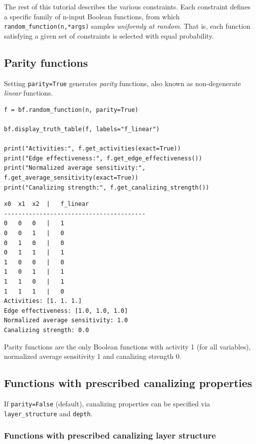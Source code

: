 \documentclass[
]{article}
\begin{document}
The rest of this tutorial describes the various constraints. Each
constraint defines a specific family of n-input Boolean functions, from
which \texttt{random\_function(n,*args)} samples \emph{uniformly at
random}. That is, each function satisfying a given set of constraints is
selected with equal probability.

\subsection{Parity functions}\label{parity-functions}

Setting \texttt{parity=True} generates \emph{parity} functions, also
known as non-degenerate \emph{linear} functions.

\begin{lstlisting}
f = bf.random_function(n, parity=True)

bf.display_truth_table(f, labels="f_linear")

print("Activities:", f.get_activities(exact=True))
print("Edge effectiveness:", f.get_edge_effectiveness())
print("Normalized average sensitivity:", f.get_average_sensitivity(exact=True))
print("Canalizing strength:", f.get_canalizing_strength())
\end{lstlisting}

\begin{lstlisting}
x0  x1  x2  |   f_linear
----------------------------------------
0   0   0   |   1
0   0   1   |   0
0   1   0   |   0
0   1   1   |   1
1   0   0   |   0
1   0   1   |   1
1   1   0   |   1
1   1   1   |   0
Activities: [1. 1. 1.]
Edge effectiveness: [1.0, 1.0, 1.0]
Normalized average sensitivity: 1.0
Canalizing strength: 0.0
\end{lstlisting}

Parity functions are the only Boolean functions with activity 1 (for all
variables), normalized average sensitivity 1 and canalizing strength 0.

\subsection{Functions with prescribed canalizing
properties}\label{functions-with-prescribed-canalizing-properties}

If \texttt{parity=False} (default), canalizing properties can be
specified via \texttt{layer\_structure} and \texttt{depth}.

\subsubsection{Functions with prescribed canalizing layer
structure}\label{functions-with-prescribed-canalizing-layer-structure}
\end{document}

